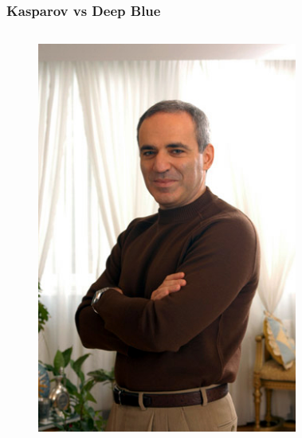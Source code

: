 \documentclass[12pt, aspectratio=169]{beamer}
\begin{document}
\begin{frame}
\frametitle{Kasparov vs Deep Blue}
\begin{columns}[c]
\begin{figure}
  \includegraphics[width=1\linewidth]{Kasparov-34.jpg}
\end{figure}
\begin{figure}

\end{figure}
\end{columns}
\end{frame}
\end{document}
